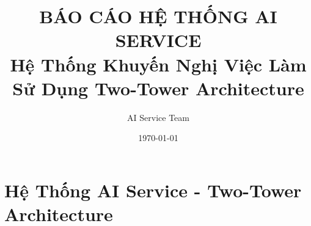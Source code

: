 \documentclass[12pt,a4paper]{report}
\title{\textbf{BÁO CÁO HỆ THỐNG AI SERVICE}\\
\large{Hệ Thống Khuyến Nghị Việc Làm Sử Dụng Two-Tower Architecture}}
\author{AI Service Team}
\date{\today}
\begin{document}
\maketitle

\newpage
\tableofcontents
\newpage


\chapter{Hệ Thống AI Service - Two-Tower Architecture}


\newpage


\newpage


\newpage


\newpage


\newpage


\end{document}
